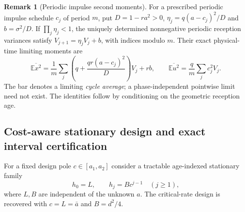 \documentclass[preprint,12pt,numbers]{elsarticle}
\theoremstyle{definition}
\newtheorem{remark}{Remark}
\begin{document}
\begin{remark}[Periodic impulse second moments]
For a prescribed periodic impulse schedule $c_j$ of period $m$, put $D=1-ra^2>0$, $\eta_j=q(a-c_j)^2/D$ and $b=\sigma^2/D$. If $\prod_j\eta_j<1$, the uniquely determined nonnegative periodic reception variances satisfy $V_{j+1}=\eta_jV_j+b$, with indices modulo $m$. Their exact physical-time limiting moments are
\begin{equation}\label{eq:periodiccost}
\overline{\mathbb E x^2}=\frac1m\sum_j\left(q+\frac{qr(a-c_j)^2}{D}\right)V_j+rb,
\qquad \overline{\mathbb E u^2}=\frac q m\sum_j c_j^2 V_j.
\end{equation}
The bar denotes a limiting \emph{cycle average}; a phase-independent pointwise limit need not exist. The identities follow by conditioning on the geometric reception age.
\end{remark}


\subsection{Cost-aware stationary design and exact interval certification}\label{sec:costaware}
For a fixed design pole $c\in[a_1,a_2]$ consider a tractable age-indexed stationary family
\begin{equation}\label{eq:geomfamily}
h_0=L,\qquad h_j=Bc^{j-1}\quad(j\ge1),
\end{equation}
where $L,B$ are independent of the unknown $a$. The critical-rate design is recovered with $c=L=\bar a$ and $B=d^2/4$.
\end{document}

